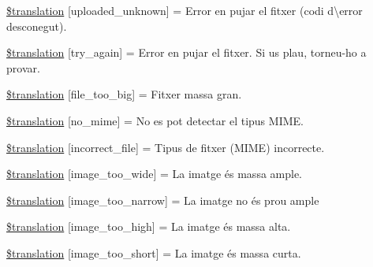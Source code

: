 \begin{DoxyCompactItemize}
\item 
\hyperlink{class_8upload_8ca___c_a_8php_a4a9168e922b827e6a28b5db1c00774ca}{\$translation} \mbox{[}\textquotesingle{}uploaded\+\_\+unknown\textquotesingle{}\mbox{]} = \textquotesingle{}Error en pujar el fitxer (codi d\textbackslash{}\textquotesingle{}error desconegut).\textquotesingle{}
\item 
\hyperlink{class_8upload_8ca___c_a_8php_a3afc377bd803683314f413a814243066}{\$translation} \mbox{[}\textquotesingle{}try\+\_\+again\textquotesingle{}\mbox{]} = \textquotesingle{}Error en pujar el fitxer. Si us plau, torneu-\/ho a provar.\textquotesingle{}
\item 
\hyperlink{class_8upload_8ca___c_a_8php_a476278eb4a0c3df56af068e2d511a741}{\$translation} \mbox{[}\textquotesingle{}file\+\_\+too\+\_\+big\textquotesingle{}\mbox{]} = \textquotesingle{}Fitxer massa gran.\textquotesingle{}
\item 
\hyperlink{class_8upload_8ca___c_a_8php_a191a55df8e3bb7f3c51b70f3c1932e02}{\$translation} \mbox{[}\textquotesingle{}no\+\_\+mime\textquotesingle{}\mbox{]} = \textquotesingle{}No es pot detectar el tipus M\+I\+M\+E.\textquotesingle{}
\item 
\hyperlink{class_8upload_8ca___c_a_8php_a4d32343e2699edd6fd435f9c832cb9c7}{\$translation} \mbox{[}\textquotesingle{}incorrect\+\_\+file\textquotesingle{}\mbox{]} = \textquotesingle{}Tipus de fitxer (M\+I\+M\+E) incorrecte.\textquotesingle{}
\item 
\hyperlink{class_8upload_8ca___c_a_8php_a0dd3e4930ca1f59ae280f4b1006525cd}{\$translation} \mbox{[}\textquotesingle{}image\+\_\+too\+\_\+wide\textquotesingle{}\mbox{]} = \textquotesingle{}La imatge és massa ample.\textquotesingle{}
\item 
\hyperlink{class_8upload_8ca___c_a_8php_a5c9a4cd67fd21c32e0a3b434591a6037}{\$translation} \mbox{[}\textquotesingle{}image\+\_\+too\+\_\+narrow\textquotesingle{}\mbox{]} = \textquotesingle{}La imatge no és prou ample\textquotesingle{}
\item 
\hyperlink{class_8upload_8ca___c_a_8php_aa27bde361343f3b63c7cd441860024f8}{\$translation} \mbox{[}\textquotesingle{}image\+\_\+too\+\_\+high\textquotesingle{}\mbox{]} = \textquotesingle{}La imatge és massa alta.\textquotesingle{}
\item 
\hyperlink{class_8upload_8ca___c_a_8php_a86fcd4e1157b00032df451188d735527}{\$translation} \mbox{[}\textquotesingle{}image\+\_\+too\+\_\+short\textquotesingle{}\mbox{]} = \textquotesingle{}La imatge és massa curta.\textquotesingle{}
\item 

\end{DoxyCompactItemize}
